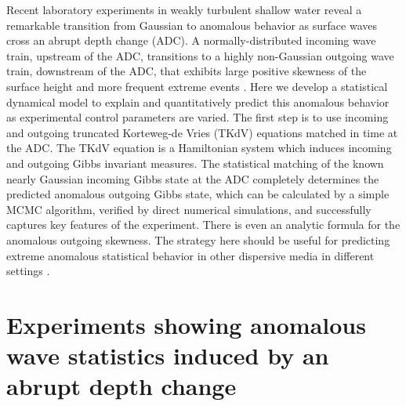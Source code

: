 \documentclass[9pt,twocolumn,twoside,lineno]{pnas-new}
\begin{document}
Recent laboratory experiments in weakly turbulent shallow water reveal a remarkable transition from Gaussian to anomalous behavior as surface waves cross an abrupt depth change (ADC). 
A normally-distributed incoming wave train, upstream of the ADC, transitions to a highly non-Gaussian outgoing wave train, downstream of the ADC, that exhibits large positive skewness of the surface height and more frequent extreme events \cite{bolles2018anomalous}.
Here we develop a statistical dynamical model to explain and quantitatively
predict this anomalous behavior as experimental control
parameters are varied. The first step is to use incoming and outgoing
truncated Korteweg-de Vries (TKdV) equations matched in time at the
ADC. The TKdV equation is a Hamiltonian system which induces incoming
and outgoing Gibbs invariant measures. The statistical matching of the known nearly Gaussian
incoming Gibbs state at the ADC completely determines the predicted
anomalous outgoing Gibbs state, which can be calculated by a simple
MCMC algorithm, verified by direct numerical simulations, and successfully
captures key features of the experiment. There is even an analytic
formula for the anomalous outgoing skewness. The strategy here should
be useful for predicting extreme anomalous statistical behavior in
other dispersive media in different settings  \cite{solli2007optical,hohmann2010freak}.

\section{Experiments showing anomalous wave statistics induced by an abrupt depth change}

\end{document}
